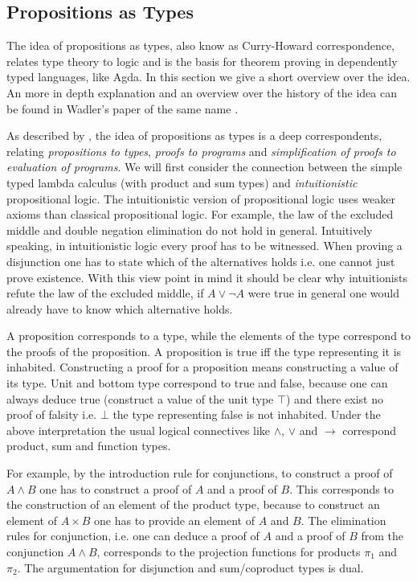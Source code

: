 \subsection{Propositions as Types}

The idea of propositions as types, also know as Curry-Howard correspondence,
relates type theory to logic and is the basis for theorem proving in
dependently typed languages, like Agda.
In this section we give a short overview over the idea.
An more in depth explanation and an overview over the history of the idea can be
found in Wadler's paper of the same name \cite{DBLP:journals/cacm/Wadler15}.

As described by \textcite{DBLP:journals/cacm/Wadler15}, the idea of propositions
as types is a deep correspondents, relating \textit{propositions to types},
\textit{proofs to programs} and \textit{simplification of proofs to evaluation
of programs}.
We will first consider the connection between the simple typed lambda calculus
(with product and sum types) and \textit{intuitionistic} propositional logic.
The intuitionistic version of propositional logic uses weaker axioms than
classical propositional logic.
For example, the law of the excluded middle and double negation elimination do
not hold in general.
Intuitively speaking, in intuitionistic logic every proof has to be witnessed.
When proving a disjunction one has to state which of the alternatives holds i.e.
one cannot just prove existence.
With this view point in mind it should be clear why intuitionists refute the law
of the excluded middle, if $A \vee \neg A$ were true in general one would
already have to know which alternative holds.

A proposition corresponds to a type, while the elements of the type correspond
to the proofs of the proposition.
A proposition is true iff the type representing it is inhabited.
Constructing a proof for a proposition means constructing a value of its type.
Unit and bottom type correspond to true and false, because one can always deduce
true (construct a value of the unit type $\top$) and there exist no proof of
falsity i.e. $\bot$ the type representing false is not inhabited.
Under the above interpretation the usual logical connectives like $\wedge$,
$\vee$ and $\rightarrow$ correspond product, sum and function types.

For example, by the introduction rule for conjunctions, to construct a proof of
$A\wedge B$ one has to construct a proof of $A$ and a proof of $B$.
This corresponds to the construction of an element of the product type, because
to construct an element of $A\times B$ one has to provide an element of $A$ and
$B$.
The elimination rules for conjunction, i.e. one can deduce a proof of $A$ and a
proof of $B$ from the conjunction $A \wedge B$, corresponds to the projection
functions for products $\pi_1$ and $\pi_2$.
The argumentation for disjunction and sum/coproduct types is dual.

